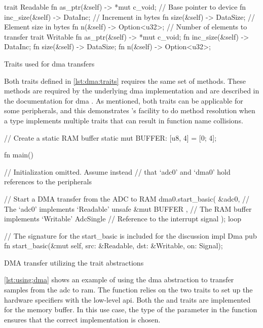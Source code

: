 \begin{listing}[H]
  \begin{rustcode}
trait Readable {
  fn as_ptr(&self) -> *mut c_void; // Base pointer to device
  fn inc_size(&self) -> DataInc;   // Increment in bytes
  fn size(&self) -> DataSize;      // Element size in bytes
  fn n(&self) -> Option<u32>;      // Number of elements to transfer
}
trait Writable {
  fn as_ptr(&self) -> *mut c_void;
  fn inc_size(&self) -> DataInc;
  fn size(&self) -> DataSize;
  fn n(&self) -> Option<u32>;
}
  \end{rustcode}
  \caption{Traits used for \gls{dma} transfers}
  \label{lst:dma:traits}
\end{listing}

Both traits defined in \autoref{lst:dma:traits} requires the same set of methods.
These methods are required by the underlying \gls{dma} implementation and are described in the {\emlib} documentation for \gls{dma} \cite{Dma2004}.
As mentioned, both traits can be applicable for some peripherals, and this demonstrates {\rust}'s facility to do method resolution when a type implements multiple traits that can result in function name collisions.

\begin{listing}[H]
  \begin{rustcode}
// Create a static RAM buffer
static mut BUFFER: [u8, 4] = [0; 4];

fn main() {
  // Initialization omitted. Assume instead
  // that `adc0' and `dma0' hold references to the peripherals

  // Start a DMA transfer from the ADC to RAM
  dma0.start_basic(
    &adc0,                  // The `adc0' implements `Readable'
    unsafe { &mut BUFFER }, // The RAM buffer implements `Writable'
    AdcSingle               // Reference to the interrupt signal
  );
  loop {}
}

// The signature for the start_basic is included for the discussion
impl Dma {
  pub fn start_basic(&mut self,
                     src: &Readable, dst: &Writable, on: Signal);
}
  \end{rustcode}
  \caption{DMA transfer utilizing the trait abstractions}
  \label{lst:using:dma}
\end{listing}

\autoref{lst:using:dma} shows an example of using the \gls{dma} abstraction to transfer samples from the \gls{adc} to \gls{ram}.
The  function relies on the two traits to set up the hardware specifiers with the low-level \gls{api}.
Both the  and  traits are implemented for the memory buffer.
In this use case, the type of the  parameter in the  function ensures that the correct implementation is chosen.

